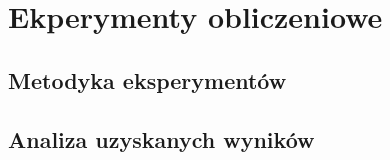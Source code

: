 \chapter{Ekperymenty obliczeniowe}
\section{Metodyka eksperymentów}
\section{Analiza uzyskanych wyników}